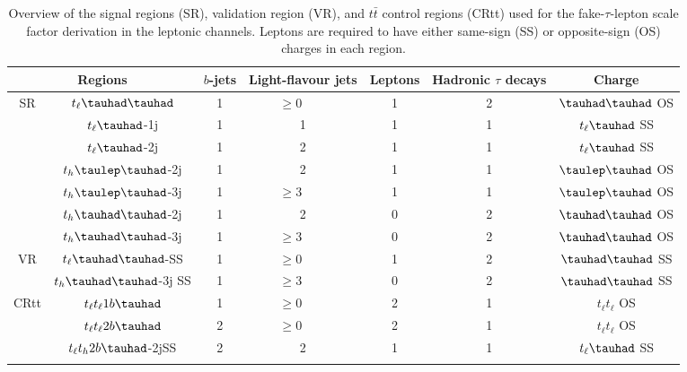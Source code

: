 \begin{table}
\caption{Overview of the signal regions (SR), validation region (VR), and $t\bar{t}$ control regions (CRtt) used for the fake-$\tau$-lepton scale factor derivation in the leptonic channels. Leptons are required to have either same-sign (SS) or opposite-sign (OS) charges in each region.}
\label{tab:srcr}
\begin{center}
\begin{tabular}[h]{c|c|c|c|c|c|c}
\hline \hline
\multicolumn{2}{c|}{Regions} & $b$-jets & Light-flavour jets        & Leptons & Hadronic $\tau$ decays & Charge\\ \hline
\multirow{7}{*}{SR}&$t_{\ell}\thadhad$     & 1     & $\ge0$~~~~                                & 1      & 2             & $\thadhad$ OS\\ \cline{2-7}
&$t_{\ell}\tauhad$-1j  & 1     & 1                                   & 1      & 1                     & $t_{\ell}\tauhad$ SS\\ \cline{2-7}
&$t_{\ell}\tauhad$-2j  & 1     & 2                                        & 1      & 1                     & $t_{\ell}\tauhad$ SS\\ \cline{2-7}
&$t_h\tlhad$-2j   & 1     & 2                           & 1      & 1             & $\tlhad$ OS\\ \cline{2-7}
&$t_h\tlhad$-3j   & 1     & $\ge3$~~~~                      & 1      & 1             & $\tlhad$ OS\\ \cline{2-7}
&$t_h\thadhad$-2j & 1     & 2                            & 0      & 2             & $\thadhad$ OS\\ \cline{2-7}
&$t_h\thadhad$-3j & 1     & $\ge3$~~~~                       & 0      & 2             & $\thadhad$ OS\\ \hline
\multirow{2}{*}{VR}&$t_{\ell}\thadhad$-SS     & 1     & $\ge0$~~~~                                & 1      & 2             & $\thadhad$ SS\\ \hline
&$t_h\thadhad$-3j SS & 1     & $\ge3$~~~~                       & 0      & 2             & $\thadhad$ SS\\ \hline
\multirow{6}{*}{CRtt}&$t_{\ell}t_{\ell}1b\tauhad$ & 1     & $\ge0$~~~~                            & 2      & 1                     & $t_{\ell}t_{\ell}$ OS\\ \cline{2-7}
&$t_{\ell}t_{\ell}2b\tauhad$      & 2     & $\ge0$~~~~                            & 2      & 1                     & $t_{\ell}t_{\ell}$ OS\\ \cline{2-7}
&$t_{\ell}t_h2b\tauhad$-2jSS & 2     & 2                             & 1      & 1             & $t_{\ell}\tauhad$ SS\\ \cline{2-7}

\end{tabular}
\end{center}
\end{table}
